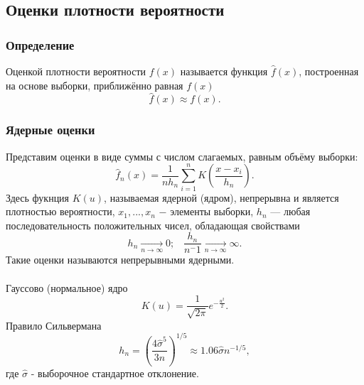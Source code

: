 \subsection{Оценки плотности вероятности}
	\subsubsection{Определение}
	\noindent Оценкой плотности вероятности $f(x)$ называется функция $\widehat{f}(x)$, построенная на основе выборки, приближённо равная $f(x)$
    \begin{equation}
        \widehat{f}(x)\approx f(x).
    \end{equation}
	\subsubsection{Ядерные оценки}
	\noindent Представим оценки в виде суммы с числом слагаемых, равным объёму выборки:\begin{equation}
        \widehat{f}_n(x)=\frac{1}{n h_n}\sum_{i=1}^n K\left(\frac{x-x_i}{h_n}\right).
    \end{equation}
    Здесь фукнция $K(u)$, называемая ядерной (ядром), непрерывна и является плотностью вероятности, $x_1,...,x_n$ $-$ элементы выборки, ${h_n}$ — любая последовательность положительных чисел, обладающая свойствами
    \begin{equation}
        h_n\xrightarrow[n\to\infty]{}0;\;\;\;\frac{h_n}{n^-1} \xrightarrow[n\to\infty]{}\infty.
    \end{equation}
    Такие оценки называются непрерывными ядерными.\\\\
    Гауссово (нормальное) ядро
    \begin{equation}
        K(u)=\frac{1}{\sqrt{2\pi}}e^{-\frac{u^2}{2}}.
    \end{equation}
    Правило Сильвермана
    \begin{equation}
        h_n=\left(\frac{4\hat{\sigma}^5}{3n}\right)^{1/5}\approx1.06\hat{\sigma}n^{-1/5},
    \end{equation}
    где $\hat{\sigma}$ - выборочное стандартное отклонение.